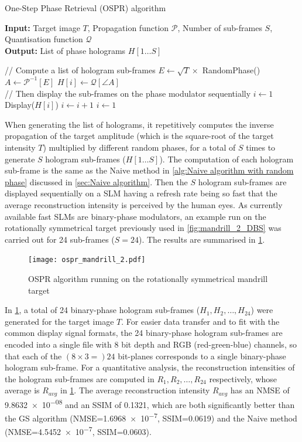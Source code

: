 \begin{algorithm}[H]
  \caption{One-Step Phase Retrieval (OSPR) algorithm}\label{alg:One-Step Phase Retrieval (OSPR) algorithm}
  \textbf{Input:} Target image $T$, Propagation function $\mathcal{P}$, Number of sub-frames $S$, Quantisation function $\mathcal{Q}$\\
  \textbf{Output:} List of phase holograms $H[1\ldots S]$
  \begin{algorithmic}
    \State // Compute a list of hologram sub-frames
    \State $E \gets \sqrt{T} \times $ RandomPhase()
    \State $A \gets \mathcal{P}^{-1}[E]$
    \State $H[i] \gets \mathcal{Q}[\angle A]$
    \EndFor\\
    \State // Then display the sub-frames on the phase modulator sequentially
    \State $i\gets 1$
    \State Display($H[i]$)
    \State $i\gets i + 1$
    \State $i\gets 1$
    \EndIf
    \EndWhile
  \end{algorithmic}
\end{algorithm}

When generating the list of holograms, it repetitively computes the inverse propagation of the target amplitude (which is the square-root of the target intensity $T$) multiplied by different random phases, for a total of $S$ times to generate $S$ hologram sub-frames ($H[1\ldots S]$). The computation of each hologram sub-frame is the same as the Naive method in \cref{alg:Naive algorithm with random phase} discussed in \cref{sec:Naive algorithm}. Then the $S$ hologram sub-frames are displayed sequentially on a SLM having a refresh rate being so fast that the average reconstruction intensity is perceived by the human eyes. As currently available fast SLMs are binary-phase modulators, an example run on the rotationally symmetrical target previously used in \cref{fig:mandrill_2_DBS} was carried out for 24 sub-frames ($S=24$). The results are summarised in \cref{fig:ospr_mandrill_2}.

\begin{figure}[H]
	\centering
	\texttt{[image: ospr\_mandrill\_2.pdf]}
	\caption{OSPR algorithm running on the rotationally symmetrical mandrill target}
	\label{fig:ospr_mandrill_2}
\end{figure}

In \cref{fig:ospr_mandrill_2}, a total of 24 binary-phase hologram sub-frames ($H_1, H_2, \ldots, H_{24}$) were generated for the target image $T$. For easier data transfer and to fit with the common display signal formats, the 24 binary-phase hologram sub-frames are encoded into a single file with 8 bit depth and RGB (red-green-blue) channels, so that each of the $(8\times 3 = )24$ bit-planes corresponds to a single binary-phase hologram sub-frame. For a quantitative analysis, the reconstruction intensities of the hologram sub-frames are computed in $R_1, R_2, \ldots, R_{24}$ respectively, whose average is $R_{avg}$ in \cref{fig:ospr_mandrill_2}. The average reconstruction intensity $R_{avg}$ has an NMSE of \num{9.8632e-08} and an SSIM of 0.1321, which are both significantly better than the GS algorithm (NMSE=\num{1.6968e-7}, SSIM=0.0619) and the Naive method (NMSE=\num{4.5452e-7}, SSIM=0.0603).

